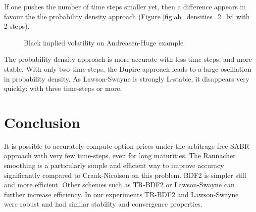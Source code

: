 \documentclass[]{rAMF2e}
\begin{document}
If one pushes the number of time steps smaller yet, then a difference appears in favour the the probability density approach (Figure \ref{fig:ah_densities_2_lv} with 2 steps).
\begin{figure}[htb]
  \begin{center}  
    \end{center}
     \caption{\label{fig:ah_impliedvols_lv} Black implied volatility on Andreasen-Huge example}
\end{figure}

The probability density approach is more accurate with less time steps, and more stable. With only two time-steps, the Dupire approach leads to a large oscillation in probability density. As Lawson-Swayne is strongly L-stable, it disappears very quickly: with three time-steps or more.


\section{Conclusion}
It is possible to accurately compute option prices under the arbitrage free SABR approach with very few time-steps, even for long maturities. The Rannacher smoothing is a particularly simple and efficient way to improve accuracy significantly compared to Crank-Nicolson on this problem. BDF2 is simpler still and more efficient. Other schemes such as TR-BDF2 or Lawson-Swayne can further increase efficiency. In our experiments TR-BDF2 and Lawson-Swayne were robust and had similar stability and convergence properties.
\end{document}
